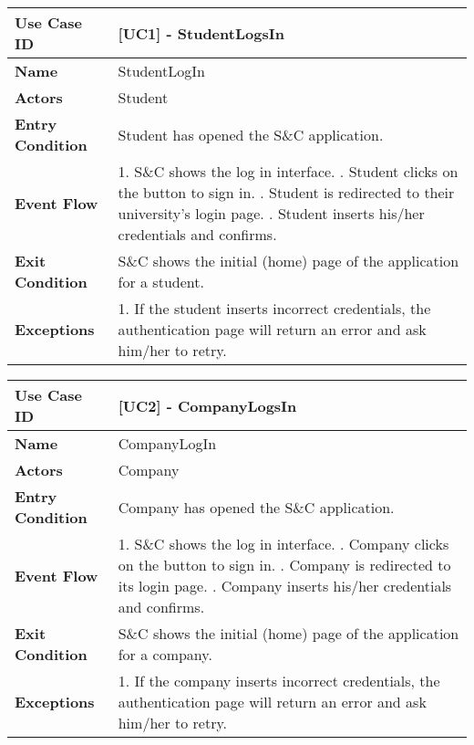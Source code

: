 \begin{table}[H]
    \centering
    \renewcommand{\arraystretch}{2}
    \begin{tabular}{|l|p{10cm}|}
    \hline
    \textbf{Use Case ID} & [UC1] - StudentLogsIn \\ \hline
    \textbf{Name} & StudentLogIn \\ \hline
    \textbf{Actors} & Student \\ \hline
    \textbf{Entry Condition} & Student has opened the S\&C application. \\ \hline
    \textbf{Event Flow} & 
    1. S\&C shows the log in interface. \newline
    2. Student clicks on the button to sign in. \newline
    3. Student is redirected to their university's login page. \newline
    4. Student inserts his/her credentials and confirms. \\ \hline
    \textbf{Exit Condition} & S\&C shows the initial (home) page of the application for a student. \\ \hline
    \textbf{Exceptions} & 
    1. If the student inserts incorrect credentials, the authentication page will return an error and ask him/her to retry. \\ \hline
    \end{tabular}
\end{table}

\newpage

\begin{table}[H]
    \centering
    \renewcommand{\arraystretch}{2}
    \begin{tabular}{|l|p{10cm}|}
    \hline
    \textbf{Use Case ID} & [UC2] - CompanyLogsIn \\ \hline
    \textbf{Name} & CompanyLogIn \\ \hline
    \textbf{Actors} & Company \\ \hline
    \textbf{Entry Condition} & Company has opened the S\&C application. \\ \hline
    \textbf{Event Flow} & 
    1. S\&C shows the log in interface. \newline
    2. Company clicks on the button to sign in. \newline
    3. Company is redirected to its login page. \newline
    4. Company inserts his/her credentials and confirms. \\ \hline
    \textbf{Exit Condition} & S\&C shows the initial (home) page of the application for a company. \\ \hline
    \textbf{Exceptions} & 
    1. If the company inserts incorrect credentials, the authentication page will return an error and ask him/her to retry. \\ \hline
    \end{tabular}
\end{table}

